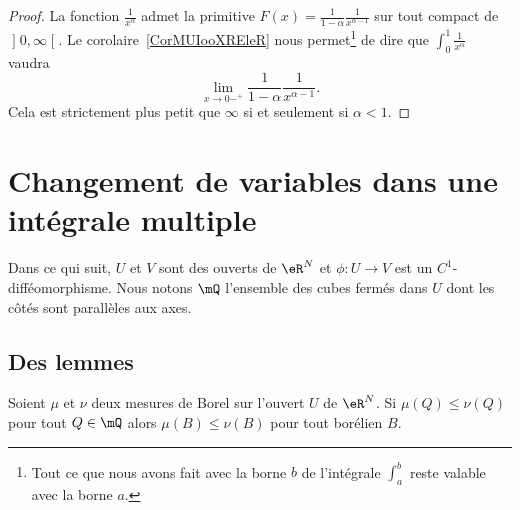 \begin{proof}
	La fonction \( \frac{1}{ x^{\alpha} }\) admet la primitive \( F(x)=\frac{1}{ 1-\alpha }\frac{1}{ x^{\alpha-1} }\) sur tout compact de \( \mathopen] 0 , \infty \mathclose[\). Le corolaire~\ref{CorMUIooXREleR} nous permet\footnote{Tout ce que nous avons fait avec la borne \( b\) de l'intégrale \( \int_a^b\) reste valable avec la borne \( a\).} de dire que \( \int_0^1\frac{1}{ x^{\alpha} }\) vaudra
	\begin{equation}
		\lim_{x\to 0-^+} \frac{1}{ 1-\alpha }\frac{1}{ x^{\alpha-1} }.
	\end{equation}
	Cela est strictement plus petit que \( \infty\) si et seulement si \( \alpha<1\).
\end{proof}

\section{Changement de variables dans une intégrale multiple}

Dans ce qui suit, \( U\) et \( V\) sont des ouverts de \( \eR^N\) et \( \phi\colon U\to V\) est un \( C^1\)-difféomorphisme. Nous notons \( \mQ\) l'ensemble des cubes fermés dans \( U\) dont les côtés sont parallèles aux axes.

\subsection{Des lemmes}

\begin{lemma}      \label{LemooJYCGooIkkDVn}
	Soient \( \mu\) et \( \nu\) deux mesures de Borel sur l'ouvert \( U\) de \( \eR^N\). Si \( \mu(Q)\leq \nu(Q)\) pour tout \( Q\in \mQ\) alors \( \mu(B)\leq \nu(B)\) pour tout borélien \( B\).
\end{lemma}

